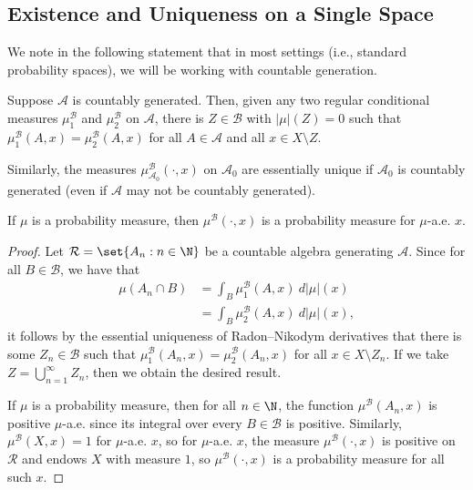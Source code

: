 \documentclass[10pt]{mypackage}
\begin{document}
\subsection{Existence and Uniqueness on a Single Space}%
We note in the following statement that in most settings (i.e., standard probability spaces), we will be working with countable generation.
\begin{proposition}[Uniqueness]
  Suppose $\mathcal{A}$ is countably generated. Then, given any two regular conditional measures $\mu_1^{\mathcal{B}}$ and $\mu_2^{\mathcal{B}}$ on $ \mathcal{A} $, there is $Z\in \mathcal{B}$ with $\left\vert \mu \right\vert\left( Z \right) = 0$ such that $\mu_1^{\mathcal{B}}\left( A,x \right) = \mu_2^{\mathcal{B}}\left( A,x \right)$ for all $A\in \mathcal{A}$ and all $x\in X\setminus Z$.

  Similarly, the measures $\mu^{\mathcal{B}}_{\mathcal{A}_0}\left( \cdot,x \right)$ on $ \mathcal{A}_0 $ are essentially unique if $\mathcal{A}_0$ is countably generated (even if $ \mathcal{A} $ may not be countably generated).

  If $\mu$ is a probability measure, then $\mu^{\mathcal{B}}\left( \cdot,x \right)$ is a probability measure for $\mu$-a.e. $x$.
\end{proposition}
\begin{proof}
  Let $ \mathcal{R} = \set{A_n : n\in \N} $ be a countable algebra generating $ \mathcal{A} $. Since for all $B\in \mathcal{B}$, we have that
  \begin{align*}
    \mu\left( A_n\cap B \right) &= \int_{B}^{} \mu_{1}^{\mathcal{B}}\left( A,x \right)\:d\left\vert \mu \right\vert(x)\\
                                &= \int_{B}^{} \mu_2^{\mathcal{B}}\left( A,x \right)\:d\left\vert \mu \right\vert(x),
  \end{align*}
  it follows by the essential uniqueness of Radon--Nikodym derivatives that there is some $Z_n\in \mathcal{B}$ such that $\mu_1^{\mathcal{B}}\left( A_n,x \right) = \mu_2^{\mathcal{B}}\left( A_n,x \right)$ for all $x\in X\setminus Z_n$. If we take $Z = \bigcup_{n=1}^{\infty}Z_n$, then we obtain the desired result.

  If $\mu$ is a probability measure, then for all $n\in \N$, the function $\mu^{\mathcal{B}}\left( A_n,x \right)$ is positive $\mu$-a.e. since its integral over every $B\in \mathcal{B}$ is positive. Similarly, $\mu^{\mathcal{B}}\left( X,x \right) = 1$ for $\mu$-a.e. $x$, so for $\mu$-a.e. $x$, the measure $\mu^{\mathcal{B}}\left( \cdot,x \right)$ is positive on $ \mathcal{R} $ and endows $X$ with measure $1$, so $\mu^{\mathcal{B}}\left( \cdot,x \right)$ is a probability measure for all such $x$.
\end{proof}
\end{document}
